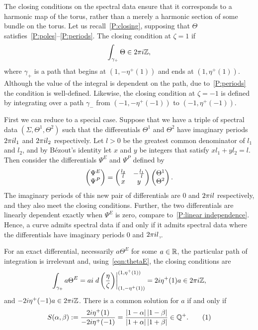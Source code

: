 \documentclass{article}
\begin{document}
The closing conditions on the spectral data ensure that it corresponds to a harmonic map of the torus, rather than a merely a harmonic section of some bundle on the torus.
Let us recall~\ref{P:closing}, supposing that $\Theta$ satisfies~\ref{P:poles}--\ref{P:periods}. The closing condition at $\zeta=1$ if
\[
\int_{\gamma_{+}} \Theta \in 2\pi i \mathbb{Z},
\]
where $\gamma_+$ is a path that begins at $(1,-\eta^+(1))$ and ends at $(1,\eta^+(1))$. Although the value of the integral is dependent on the path, due to~\ref{P:periods} the condition is well-defined. Likewise, the closing condition at $\zeta=-1$ is defined by integrating over a path $\gamma_-$ from $(-1,-\eta^+(-1))$ to $(-1,\eta^+(-1))$. 

First we can reduce to a special case. Suppose that we have a triple of spectral data $(\Sigma,\Theta^1,\Theta^2)$ such that the differentials $\Theta^1$ and $\Theta^2$ have imaginary periods $2\pi i l_1$ and $2\pi i l_2$ respectively. Let $l>0$ be the greatest common denominator of $l_1$ and $l_2$, and by B\'ezout's identity let $x$ and $y$ be integers that satisfy $xl_1 + yl_2 = l$. Then consider the differentials $\Psi^E$ and $\Psi^P$ defined by
\[
\begin{pmatrix} \Psi^E \\ \Psi^P \end{pmatrix} =
\begin{pmatrix}
\tfrac{l_2}{l}    &   -\tfrac{l_1}{l} \\
x                       &   y
\end{pmatrix}
\begin{pmatrix} \Theta^1 \\ \Theta^2 \end{pmatrix}.
\]
The imaginary periods of this new pair of differentials are $0$ and $2\pi i l$ respectively, and they also meet the closing conditions. Further, the two differentials are linearly dependent exactly when $\Psi^E$ is zero, compare to~\ref{P:linear independence}. Hence, a curve admits spectral data if and only if it admits spectral data where the differentials have imaginary periods $0$ and $2\pi i l$,.

For an exact differential, necessarily $a\Theta^E$ for some $a\in\mathbb{R}$, the particular path of integration is irrelevant and, using~\eqref{eqn:thetaE}, the closing conditions are
\[
\int_{\gamma_{+}} a\Theta^E 
= ai \left. d\left(\frac{\eta}{\zeta}\right) \right|_{(1, -\eta^+(1))}^{(1, \eta^+(1))} 
= 2i \eta^+(1)a 
\in 2\pi i \mathbb{Z},
\]
and $-2i \eta^+(-1)a \in 2\pi i\mathbb{Z}$.
There is a common solution for $a$ if and only if
\[
S(\alpha,\beta) := \frac{2\iu \eta^+(1)}{-2\iu \eta^+(-1)} = \frac{\abs{1-\alpha}\abs{1-\beta}}{\abs{1+\alpha}\abs{1+\beta}} \in \Q^+.
\labelthis{eqn:def_S}
\]
\end{document}
